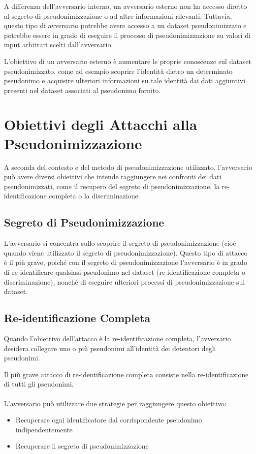 A differenza dell'avversario interno, un avversario esterno non ha accesso diretto al segreto di pseudonimizzazione o ad altre informazioni rilevanti. Tuttavia, questo tipo di avversario potrebbe avere accesso a un dataset pseudonimizzato e potrebbe essere in grado di eseguire il processo di pseudonimizzazione su valori di input arbitrari scelti dall'avversario.

L'obiettivo di un avversario esterno è aumentare le proprie conoscenze sul dataset pseudonimizzato, come ad esempio scoprire l'identità dietro un determinato pseudonimo e acquisire ulteriori informazioni su tale identità dai dati aggiuntivi presenti nel dataset associati al pseudonimo fornito.


\section{Obiettivi degli Attacchi alla Pseudonimizzazione}

A seconda del contesto e del metodo di pseudonimizzazione utilizzato, l'avversario può avere diversi obiettivi che intende raggiungere nei confronti dei dati pseudonimizzati, come il recupero del segreto di pseudonimizzazione, la re-identificazione completa o la discriminazione. 

\subsection{Segreto di Pseudonimizzazione}

L'avversario si concentra sullo scoprire il segreto di pseudonimizzazione (cioè quando viene utilizzato il segreto di pseudonimizzazione). Questo tipo di attacco è il più grave, poiché con il segreto di pseudonimizzazione l'avversario è in grado di re-identificare qualsiasi pseudonimo nel dataset (re-identificazione completa o discriminazione), nonché di eseguire ulteriori processi di pseudonimizzazione sul dataset.

\subsection{Re-identificazione Completa}

Quando l'obiettivo dell'attacco è la re-identificazione completa, l'avversario desidera collegare uno o più pseudonimi all'identità dei detentori degli pseudonimi.

Il più grave attacco di re-identificazione completa consiste nella re-identificazione di tutti gli pseudonimi. 
\\\\
L'avversario può utilizzare due strategie per raggiungere questo obiettivo: 
\begin{itemize}
    \item Recuperare ogni identificatore dal corrispondente pseudonimo indipendentemente 
    \item Recuperare il segreto di pseudonimizzazione
\end{itemize}

